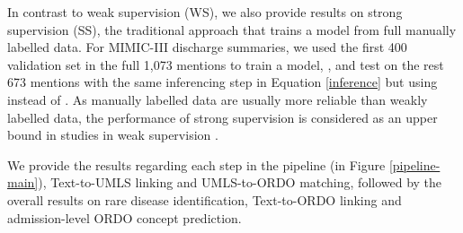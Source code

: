 \documentclass[twocolumn]{bmcart}
\begin{document}
In contrast to weak supervision (WS), we also provide results on strong supervision (SS), the traditional approach that trains a model from full manually labelled data. For MIMIC-III discharge summaries, we used the first 400 validation set in the full 1,073 mentions to train a model, , and test on the rest 673 mentions with the same inferencing step in Equation \ref{inference} but using  instead of . As manually labelled data are usually more reliable than weakly labelled data, the performance of strong supervision is considered as an upper bound in studies in weak supervision \cite{fries2021ontology,ratner2020snorkel}.

We provide the results regarding each step in the pipeline (in Figure \ref{pipeline-main}), Text-to-UMLS linking and UMLS-to-ORDO matching, followed by the overall results on rare disease identification, Text-to-ORDO linking and admission-level ORDO concept prediction.
\end{document}
